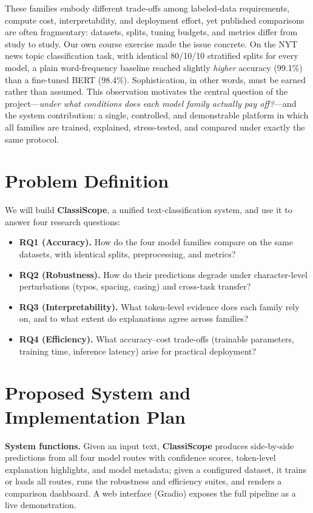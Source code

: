 \documentclass[11pt]{article}
\begin{document}
These families embody different trade-offs among labeled-data requirements, compute cost, interpretability, and deployment effort, yet published comparisons are often fragmentary: datasets, splits, tuning budgets, and metrics differ from study to study. Our own course exercise made the issue concrete. On the NYT news topic classification task, with identical 80/10/10 stratified splits for every model, a plain word-frequency baseline reached slightly \emph{higher} accuracy (99.1\%) than a fine-tuned BERT (98.4\%). Sophistication, in other words, must be earned rather than assumed. This observation motivates the central question of the project---\emph{under what conditions does each model family actually pay off?}---and the system contribution: a single, controlled, and demonstrable platform in which all families are trained, explained, stress-tested, and compared under exactly the same protocol.

\section{Problem Definition}

We will build \textbf{ClassiScope}, a unified text-classification system, and use it to answer four research questions:

\begin{itemize}
\item \textbf{RQ1 (Accuracy).} How do the four model families compare on the same datasets, with identical splits, preprocessing, and metrics?
\item \textbf{RQ2 (Robustness).} How do their predictions degrade under character-level perturbations (typos, spacing, casing) and cross-task transfer?
\item \textbf{RQ3 (Interpretability).} What token-level evidence does each family rely on, and to what extent do explanations agree across families?
\item \textbf{RQ4 (Efficiency).} What accuracy--cost trade-offs (trainable parameters, training time, inference latency) arise for practical deployment?
\end{itemize}

\section{Proposed System and Implementation Plan}

\textbf{System functions.} Given an input text, \textbf{ClassiScope} produces side-by-side predictions from all four model routes with confidence scores, token-level explanation highlights, and model metadata; given a configured dataset, it trains or loads all routes, runs the robustness and efficiency suites, and renders a comparison dashboard. A web interface (Gradio) exposes the full pipeline as a live demonstration.
\end{document}
